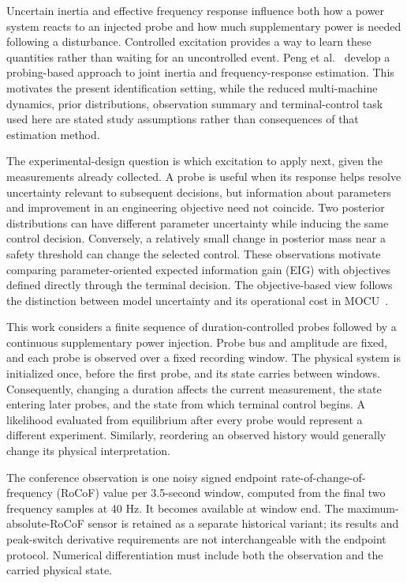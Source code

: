\documentclass[journal]{IEEEtran}
\begin{document}
Uncertain inertia and effective frequency response influence both how a power
system reacts to an injected probe and how much supplementary power is needed
following a disturbance. Controlled excitation provides a way to learn these
quantities rather than waiting for an uncontrolled event. Peng et
al.~\cite{peng2024probing} develop a probing-based approach to joint inertia
and frequency-response estimation. This motivates the present identification
setting, while the reduced multi-machine dynamics, prior distributions,
observation summary and terminal-control task used here are stated study
assumptions rather than consequences of that estimation method.

The experimental-design question is which excitation to apply next, given the
measurements already collected. A probe is useful when its response helps
resolve uncertainty relevant to subsequent decisions, but information about
parameters and improvement in an engineering objective need not coincide.
Two posterior distributions can have different parameter uncertainty while
inducing the same control decision. Conversely, a relatively small change in
posterior mass near a safety threshold can change the selected control.
These observations motivate comparing parameter-oriented expected information
gain (EIG) with objectives defined directly through the terminal decision.
The objective-based view follows the distinction between model uncertainty
and its operational cost in MOCU~\cite{yoon2013mocu,boluki2018generalized}.

This work considers a finite sequence of duration-controlled probes followed
by a continuous supplementary power injection. Probe bus and amplitude are
fixed, and each probe is observed over a fixed recording window. The physical
system is initialized once, before the first probe, and its state carries
between windows. Consequently, changing a duration affects the current
measurement, the state entering later probes, and the state from which
terminal control begins. A likelihood evaluated from equilibrium after every
probe would represent a different experiment. Similarly, reordering an
observed history would generally change its physical interpretation.

The conference observation is one noisy signed endpoint
rate-of-change-of-frequency (RoCoF) value per 3.5-second window, computed from
the final two frequency samples at 40 Hz. It becomes available at window end.
The maximum-absolute-RoCoF sensor is retained as a separate historical variant;
its results and peak-switch derivative requirements are not interchangeable
with the endpoint protocol. Numerical differentiation must include both the
observation and the carried physical state.
\end{document}
